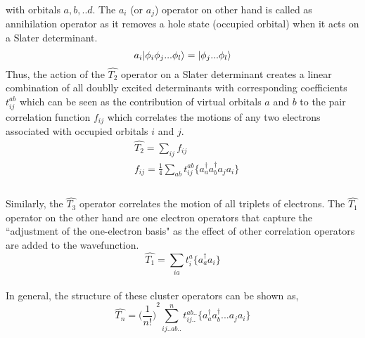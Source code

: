 with orbitals $a,b,..d$. The $a_i$ (or $a_j$) operator on other hand is called 
as annihilation operator as it removes a hole state (occupied orbital) when it 
acts on a Slater determinant.
\begin{equation}
a_i| \phi_i\phi_j...\phi_l \rangle = | \phi_j...\phi_l \rangle
\end{equation}
Thus, the action of the $\hat{T_2} $ operator on a Slater determinant creates a 
linear combination of all doublly excited determinants with corresponding coefficients
$t^{ab}_{ij}$ which can be seen as the contribution of virtual orbitals $a$ and $b$
to the pair correlation function $f_{ij}$ which correlates the motions of any two 
electrons associated with occupied orbitals $i$ and $j$. 
\\
\begin{equation}
\begin{split}
& \hat{T_2} = \sum_{ij}f_{ij} \\
& f_{ij} = \frac{1}{4}\sum_{ab}t^{ab}_{ij}\{a^\dagger_aa^\dagger_ba_ja_i\}\\
\end{split}
\end{equation}
\\
Similarly, the ${\hat{T_3}}$ operator correlates the motion of all triplets of electrons. 
The $\hat{T_1}$ operator on the other hand are one electron operators that capture the 
``adjustment of the one-electron basis"\cite{} as the effect of other correlation operators 
are added to the wavefunction.
\\
\begin{equation}
\hat{T_1} = \sum_{ia}t^a_i\{{a}^\dagger_a a_i\}
\end{equation}
\\
In general, the structure of these cluster operators can be shown as,
\\
\begin{equation}
\hat{T_n} = {\bigg(\frac{1}{n!}\bigg)}^2\sum_{ij..ab..}^nt^{ab..}_{ij..}\{a^\dagger_aa^\dagger_b...a_ja_i\}
\end{equation}
\\
